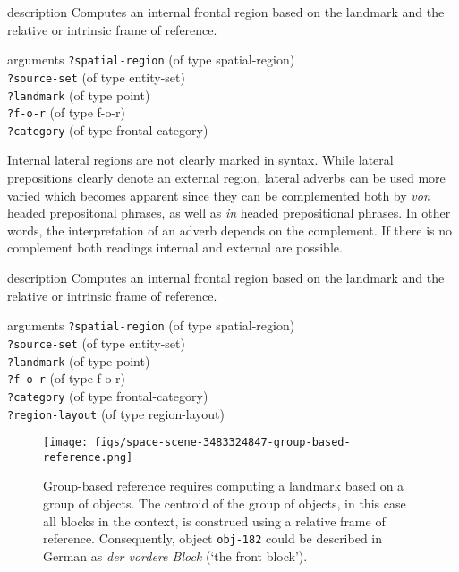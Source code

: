 \begin{explanation}{description}
Computes an internal frontal region based on the landmark
and the relative or intrinsic frame of reference.
\end{explanation}
\begin{explanation}{arguments}
{\footnotesize\verb+?spatial-region+} (of type spatial-region) \\
{\footnotesize\verb+?source-set+} (of type entity-set) \\
{\footnotesize\verb+?landmark+} (of type point)\\
{\footnotesize\verb+?f-o-r+} (of type f-o-r)\\
{\footnotesize\verb+?category+} (of type frontal-category)
\vspace{0.3cm}
\end{explanation}

Internal lateral regions are not clearly marked in syntax. 
While lateral prepositions clearly denote an external region, 
lateral adverbs can be used more varied which becomes apparent
since they can be complemented both by \textit{von} headed prepositonal
phrases, as well as \textit{in} headed prepositional phrases.
In other words, the interpretation of an adverb depends
on the complement. If there is no complement both readings
internal and external are possible. 

\begin{explanation}{description}
Computes an internal frontal region based on the landmark
and the relative or intrinsic frame of reference.
\end{explanation}
\begin{explanation}{arguments}
{\footnotesize\verb+?spatial-region+} (of type spatial-region) \\
{\footnotesize\verb+?source-set+} (of type entity-set) \\
{\footnotesize\verb+?landmark+} (of type point)\\
{\footnotesize\verb+?f-o-r+} (of type f-o-r)\\
{\footnotesize\verb+?category+} (of type frontal-category)\\
{\footnotesize\verb+?region-layout+} (of type region-layout)
\vspace{0.3cm}
\end{explanation}

\begin{figure}
\begin{centering}
\texttt{[image: figs/space-scene-3483324847-group-based-reference.png]}
\caption[Group-based reference explanation.]
{Group-based reference requires computing a landmark based on 
a group of objects. The centroid of the group of objects, in this case 
all blocks in the context, is construed using a relative frame of reference.
Consequently, object {\footnotesize\tt obj-182} could be described in German as 
\textit{der vordere Block} (`the front block').}
\label{f:6:space-scene-2}
\end{centering}
\end{figure}

